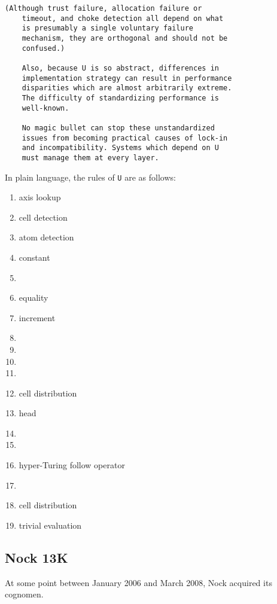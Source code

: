 \documentclass[twoside]{article}
\begin{document}
\begin{lstlisting}[label=lst:u,caption={U, 31 January 2006.  The earliest extant patriarch of the Nock family.},style=listingcode]
    (Although trust failure, allocation failure or
    timeout, and choke detection all depend on what
    is presumably a single voluntary failure
    mechanism, they are orthogonal and should not be
    confused.)

    Also, because U is so abstract, differences in
    implementation strategy can result in performance
    disparities which are almost arbitrarily extreme.
    The difficulty of standardizing performance is
    well-known.

    No magic bullet can stop these unstandardized
    issues from becoming practical causes of lock-in
    and incompatibility. Systems which depend on U
    must manage them at every layer.
\end{lstlisting}

In plain language, the rules of \texttt{U} are as follows:

\begin{enumerate}[label=(\alph*)]
  \item  axis lookup
  \item  cell detection
  \item  atom detection
  \item  constant
  \item
  \item  equality
  \item  increment
  \item
  \item
  \item
  \item
  \item  cell distribution
  \item  head
  \item
  \item
  \item  hyper-Turing follow operator
  \item
  \item  cell distribution
  \item  trivial evaluation
\end{enumerate}

\subsection{Nock 13K}

At some point between January 2006 and March 2008, Nock acquired its cognomen.
\end{document}
